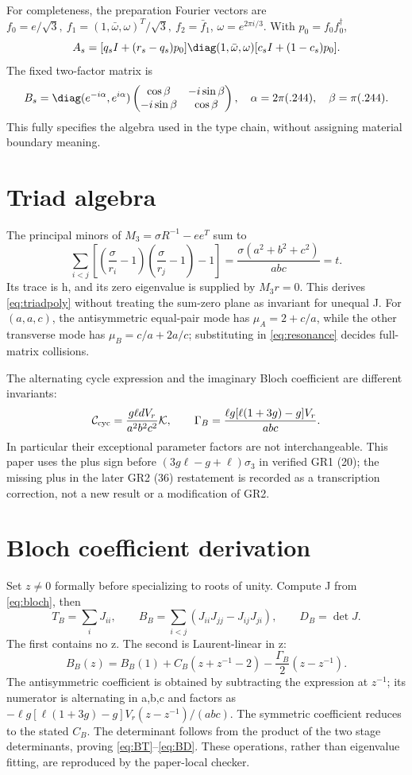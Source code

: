 For completeness, the preparation Fourier vectors are
\(f_0=e/\sqrt3,\ f_1=(1,\bar\omega,\omega)^T/\sqrt3,\ f_2=\bar f_1\),
\(\omega=e^{2\pi i/3}\). With \(p_0=f_0f_0^\dagger\),
\[
A_s=[q_sI+(r_s-q_s)p_0]\diag(1,\bar\omega,\omega)
[c_sI+(1-c_s)p_0].
\]
The fixed two-factor matrix is
\[
B_s=\diag(e^{-i\alpha},e^{i\alpha})
\begin{pmatrix}\cos\beta&-i\sin\beta\\-i\sin\beta&\cos\beta\end{pmatrix},
\quad\alpha=2\pi(.244),\quad\beta=\pi(.244).
\]
This fully specifies the algebra used in the type chain, without assigning material boundary meaning.



\section{Triad algebra}\label{app:triad}
The principal minors of \(M_3=\sigma R^{-1}-ee^T\) sum to
\[
\sum_{i<j}\left[\left(\frac{\sigma}{r_i}-1\right)
\left(\frac{\sigma}{r_j}-1\right)-1\right]
=\frac{\sigma(a^2+b^2+c^2)}{abc}=t.
\]
Its trace is h, and its zero eigenvalue is supplied by \(M_3r=0\). This derives \eqref{eq:triadpoly} without treating the sum-zero plane as invariant for unequal J. For \((a,a,c)\), the antisymmetric equal-pair mode has
\(\mu_A=2+c/a\), while the other transverse mode has
\(\mu_B=c/a+2a/c\); substituting in \eqref{eq:resonance} decides full-matrix collisions.

The alternating cycle expression and the imaginary Bloch coefficient are different invariants:
\[
\mathcal C_{\rm cyc}=\frac{g\ell dV_r}{a^2b^2c^2}\mathcal K,\qquad
\Gamma_B=\frac{\ell g[\ell(1+3g)-g]V_r}{abc}.
\]
In particular their exceptional parameter factors are not interchangeable. This paper uses the plus sign before \((3g\ell-g+\ell)\sigma_3\) in verified GR1 (20); the missing plus in the later GR2 (36) restatement is recorded as a transcription correction, not a new result or a modification of GR2.

\section{Bloch coefficient derivation}\label{app:bloch}
Set \(z\ne0\) formally before specializing to roots of unity. Compute J from \eqref{eq:bloch}, then
\[
T_B=\sum_iJ_{ii},\qquad
B_B=\sum_{i<j}(J_{ii}J_{jj}-J_{ij}J_{ji}),\qquad D_B=\det J.
\]
The first contains no z. The second is Laurent-linear in z:
\[
B_B(z)=B_B(1)+C_B(z+z^{-1}-2)-\frac{\Gamma_B}{2}(z-z^{-1}).
\]
The antisymmetric coefficient is obtained by subtracting the expression at \(z^{-1}\); its numerator is alternating in a,b,c and factors as
\(-\ell g[\ell(1+3g)-g]V_r(z-z^{-1})/(abc)\).
The symmetric coefficient reduces to the stated \(C_B\). The determinant follows from the product of the two stage determinants, proving \eqref{eq:BT}--\eqref{eq:BD}. These operations, rather than eigenvalue fitting, are reproduced by the paper-local checker.

